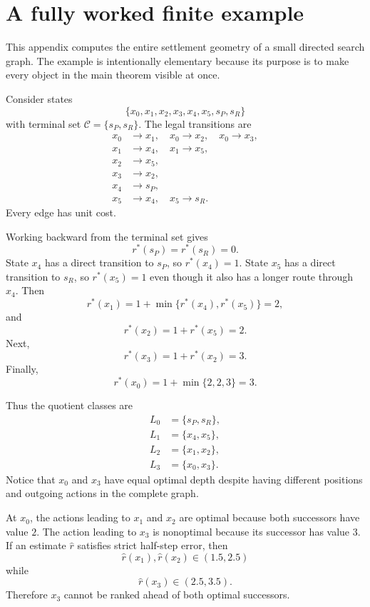 \documentclass[11pt,letterpaper]{article}
\theoremstyle{remark}
\newcommand{\Cset}{\mathcal C}
\newcommand{\rstar}{r^{\!*}}
\newcommand{\rhat}{\widehat r}
\begin{document}
\appendix

\section{A fully worked finite example}\label{app:example}

This appendix computes the entire settlement geometry of a small directed search graph. The example is intentionally elementary because its purpose is to make every object in the main theorem visible at once.

Consider states
\[
\{x_0,x_1,x_2,x_3,x_4,x_5,s_P,s_R\}
\]
with terminal set $\Cset=\{s_P,s_R\}$. The legal transitions are
\[
\begin{aligned}
x_0&\to x_1,\quad x_0\to x_2,\quad x_0\to x_3,\\
x_1&\to x_4,\quad x_1\to x_5,\\
x_2&\to x_5,\\
x_3&\to x_2,\\
x_4&\to s_P,\\
x_5&\to x_4,\quad x_5\to s_R.
\end{aligned}
\]
Every edge has unit cost.

Working backward from the terminal set gives
\[
\rstar(s_P)=\rstar(s_R)=0.
\]
State $x_4$ has a direct transition to $s_P$, so $\rstar(x_4)=1$. State $x_5$ has a direct transition to $s_R$, so $\rstar(x_5)=1$ even though it also has a longer route through $x_4$. Then
\[
\rstar(x_1)=1+\min\{\rstar(x_4),\rstar(x_5)\}=2,
\]
and
\[
\rstar(x_2)=1+\rstar(x_5)=2.
\]
Next,
\[
\rstar(x_3)=1+\rstar(x_2)=3.
\]
Finally,
\[
\rstar(x_0)=1+\min\{2,2,3\}=3.
\]

Thus the quotient classes are
\[
\begin{aligned}
L_0&=\{s_P,s_R\},\\
L_1&=\{x_4,x_5\},\\
L_2&=\{x_1,x_2\},\\
L_3&=\{x_0,x_3\}.
\end{aligned}
\]
Notice that $x_0$ and $x_3$ have equal optimal depth despite having different positions and outgoing actions in the complete graph.

At $x_0$, the actions leading to $x_1$ and $x_2$ are optimal because both successors have value $2$. The action leading to $x_3$ is nonoptimal because its successor has value $3$. If an estimate $\rhat$ satisfies strict half-step error, then
\[
\rhat(x_1),\rhat(x_2)\in(1.5,2.5)
\]
while
\[
\rhat(x_3)\in(2.5,3.5).
\]
Therefore $x_3$ cannot be ranked ahead of both optimal successors.
\end{document}
